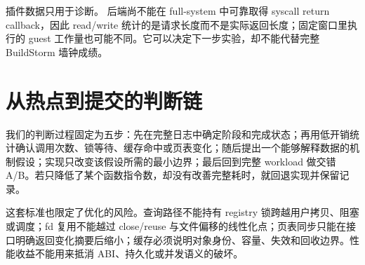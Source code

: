 插件数据只用于诊断。 后端尚不能在 full-system 中可靠取得 syscall return callback，因此 read/write 统计的是请求长度而不是实际返回长度；固定窗口里执行的 guest 工作量也可能不同。它可以决定下一步实验，却不能代替完整 BuildStorm 墙钟成绩。

\section{从热点到提交的判断链}

我们的判断过程固定为五步：先在完整日志中确定阶段和完成状态；再用低开销统计确认调用次数、锁等待、缓存命中或页表变化；随后提出一个能够解释数据的机制假设；实现只改变该假设所需的最小边界；最后回到完整 workload 做交错 A/B。若只降低了某个函数指令数，却没有改善完整耗时，就回退实现并保留记录。

这套标准也限定了优化的风险。查询路径不能持有 registry 锁跨越用户拷贝、阻塞或调度；fd 复用不能越过 close/reuse 与文件偏移的线性化点；页表同步只能在接口明确返回变化摘要后缩小；缓存必须说明对象身份、容量、失效和回收边界。性能收益不能用来抵消 ABI、持久化或并发语义的破坏。
